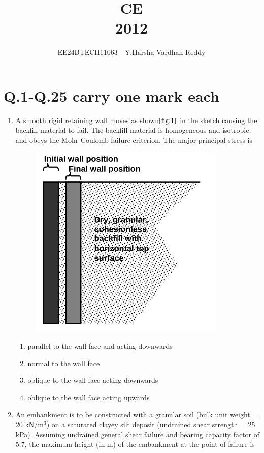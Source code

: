 \documentclass[journal]{IEEEtran}
\numberwithin{equation}{enumi}
\numberwithin{figure}{enumi}
\begin{document}

\vspace{3cm}

\title{CE\\2012}
\author{EE24BTECH11063 - Y.Harsha Vardhan Reddy}
\maketitle

\bigskip

\section*{Q.1-Q.25 carry one mark each}
\begin{enumerate}

\item A smooth rigid retaining wall moves as shown$\ref{fig:1}$ in the sketch causing the backfill material to fail. The backfill material is homogeneous and isotropic, and obeys the Mohr-Coulomb failure criterion. The major principal stress is
\begin{figure}[H]
    \centering
    \includegraphics[scale=0.5]{figs/1.png}
    \caption{}
    \label{fig:1}
\end{figure}
\begin{enumerate}
    \item parallel to the wall face and acting downwards
    \item normal to the wall face
    \item oblique to the wall face acting downwards
    \item oblique to the wall face acting upwards
\end{enumerate}
\item An embankment is to be constructed with a granular soil (bulk unit weight = 20 kN/m$^3$) on a saturated clayey silt deposit (undrained shear strength = 25 kPa). Assuming undrained general shear failure and bearing capacity factor of 5.7, the maximum height (in m) of the embankment at the point of failure is


\end{enumerate}
\end{document}

